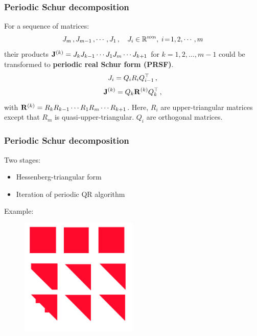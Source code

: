 \documentclass[mathserif, handout]{beamer}
\begin{document}
\begin{frame}
  \frametitle{Periodic Schur decomposition \cite{Bojanczyk92theperiodic}}
  For a sequence of matrices:
  \begin{equation}
    J_{m}\,,J_{m-1}\,,\cdots, J_{1}\,,\quad
    J_{i}\in \mathbb{R}^{n\!\times\! n},\; i\!=\!1,2,\cdots,m
    \label{eq:problem}
  \end{equation}
their products $\mathbf{J}^{(k)}=J_{k}J_{k-1}\cdots 
J_{1}J_{m}\cdots
J_{k+1}$ for $k=1,2,\dots,m\!-\!1$ could be transformed to 
\textbf{periodic real Schur form (PRSF)}.
  \begin{equation}
    \label{eq:prsf}
    J_{i}=Q_{i}R_{i}Q_{i-1}^\top
    \,,
  \end{equation}
\begin{equation}
  \label{eq:pedrotation}
  \mathbf{J}^{(k)}=Q_{k}\mathbf{R}^{(k)}Q_{k}^\top
  \,,
\end{equation}
with
$\mathbf{R}^{(k)}=R_{k}R_{k-1}\cdots R_{1}R_{m}\cdots R_{k+1}$. Here, $R_i$ are 
{\color{red} upper-triangular} matrices except that $R_m$ is
{\color{red} quasi-upper-triangular}.
$Q_i$ are orthogonal matrices.
\end{frame}

\begin{frame}
  \frametitle{Periodic Schur decomposition}
  Two stages:
  \begin{itemize}
  \item Hessenberg-triangular form
  \item Iteration of periodic QR algorithm
  \end{itemize}
  Example:
  \begin{figure}[h]
    \centering
    \includegraphics[width=0.5\textwidth]{per_schur_algorithm.pdf}
  \end{figure}


\end{frame}
\end{document}
